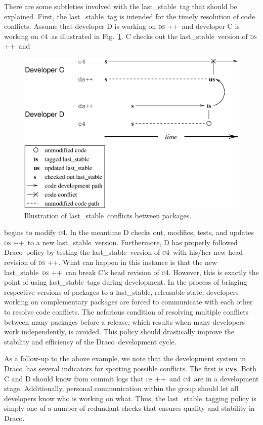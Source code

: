 \documentclass[11pt]{nmemo}
\newcommand{\draco}{{\normalfont\normalsize\sffamily Draco}}
\newcommand{\cfour}{{\normalfont\normalsize\scshape c\small 4}}
\newcommand{\dsxx}{{\normalfont\normalsize\scshape ds\raisebox{.2ex}
  {\scriptsize ++}}}
\newcommand{\stable}{{\normalfont\normalsize\ttfamily last\_stable}}
\begin{document}
There are some subtleties involved with the \stable\ tag that should
be explained.  First, the \stable\ tag is intended for the timely
resolution of code conflicts.  Assume that developer D is working on
\dsxx\ and developer C is working on \cfour\ as illustrated in
Fig.~\ref{fig:ab}.  C checks out the \stable\ version of \dsxx\ and
\begin{figure}
  \centerline{\includegraphics[width=5in]{AB.eps}}
  \caption{Illustration of \stable\ conflicts between packages.}
  \label{fig:ab}
\end{figure}
begins to modify \cfour.  In the meantime D checks out, modifies,
tests, and updates \dsxx\ to a new \stable\ version.  Furthermore, D
has properly followed \draco\ policy by testing the \stable\ version
of \cfour\ with his/her new head revision of \dsxx.  What can happen
in this instance is that the new \stable\ \dsxx\ can break C's head
revision of \cfour.  However, this is exactly the point of using
\stable\ tags during development.  In the process of bringing
respective versions of packages to a \stable, releasable state,
developers working on complementary packages are forced to communicate
with each other to resolve code conflicts.  The nefarious condition of
resolving multiple conflicts between many packages before a release,
which results when many developers work independently, is avoided.
This policy should drastically improve the stability and efficiency of
the \draco\ development cycle.

As a follow-up to the above example, we note that the development
system in \draco\ has several indicators for spotting possible
conflicts.  The first is {\bf cvs}.  Both C and D should know from
commit logs that \dsxx\ and \cfour\ are in a development stage.
Additionally, personal communication within the group should let all
developers know who is working on what.  Thus, the \stable\ tagging
policy is simply one of a number of redundant checks that ensures
quality and stability in \draco.
\end{document}

